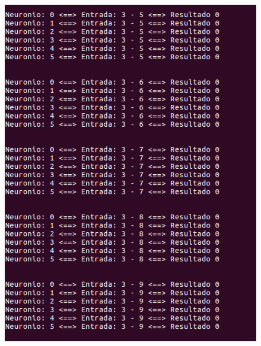 \documentclass[hidelinks,12pt]{article}
\begin{document}
		\begin{figure}[!h]
			\centering
			\includegraphics[scale=0.5]{Figures/E3S3P2R.png}
		\end{figure}
		
\end{document}
